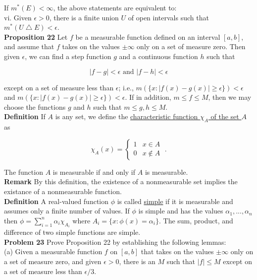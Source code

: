 \documentclass[a4paper]{article}
\begin{document}
If $m^*(E) < \infty$, the above statements are equivalent to:\\

vi. Given $\epsilon > 0$, there is a finite union $U$ of open intervals such that $m^*(U \bigtriangleup E) < \epsilon$.\\

{\bf Proposition 22} Let $f$ be a measurable function defined on an interval $[a,b]$, and assume that $f$ takes on the values $\pm \infty$ only on a set of measure zero. Then given $\epsilon$, we can find a step function $g$ and a continuous function $h$ such that

$$|f-g| < \epsilon \text{ and } |f-h| < \epsilon $$

except on a set of measure less than $\epsilon$; i.e., $m(\{x : |f(x) - g(x)| \geq \epsilon \}) < \epsilon$ and $m(\{x : |f(x) - g(x)| \geq \epsilon \}) < \epsilon$. If in addition, $m \leq f \leq M$, then we may choose the functions $g$ and $h$ such that $m \leq g,h \leq M$. \\

{\bf Definition} If $A$ is any set, we define the \underline{characteristic function $\chi_A$ of the set $A$} as

$$ \chi_A(x) = \begin{cases}
1 & x \in A\\
0 & x \not\in A
\end{cases} \;.$$

The function $A$ is measurable if and only if $A$ is measurable.\\

{\bf Remark} By this definition, the existence of a nonmeasurable set implies the existance of a nonmeasurable function. \\

{\bf Definition} A real-valued function $\phi$ is called \underline{simple} if it is measurable and assumes only a finite number of values. If $\phi$ is simple and has the values $\alpha_1,...,\alpha_n$ then $\phi = \sum_{i=1}^n \alpha_i \chi_{A_i}$ where $A_i = \{x : \phi(x) = \alpha_i\}$. The sum, product, and difference of two simple functions are simple. \\


{\bf Problem 23} Prove Proposition 22 by establishing the following lemmas:\\

(a) Given a measurable function $f$ on $[a,b]$ that takes on the values $\pm \infty$ only on a set of measure zero, and given $\epsilon > 0$, there is an $M$ such that $|f| \leq M$ except on a set of measure less than $\epsilon / 3$.\\
\end{document}
